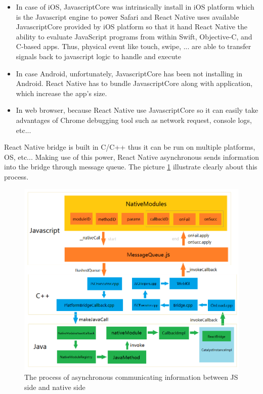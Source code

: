 \begin{itemize}
\item In case of iOS, JavascriptCore was intrinsically install in iOS platform which is the Javascript engine to power Safari and React Native uses available JavascriptCore provided by iOS platform so that it hand React Native the ability to evaluate JavaScript programs from within Swift, Objective-C, and C-based apps. Thus, physical event like touch, swipe, ... are able to transfer signals back to javascript logic to handle and execute
\item In case Android, unfortunately, JavascriptCore has been not installing in Android. React Native has to bundle JavascriptCore along with application, which increase the app's size. 
\item In web browser, because React Native use JavascriptCore so it can easily take advantages of Chrome debugging tool such as network request, console logs, etc... 
\end{itemize}

React Native bridge is built in C/C++ thus it can be run on multiple platforms, OS, etc... Making use of this power, React Native asynchronous sends information into the bridge through message queue. The picture \ref{fig:RN-process-communication} illustrate clearly about this process.
	
\begin{figure}[!h]
   	\centering
    	\includegraphics[scale=0.5]{Picture/mobile/RN-bridge.png}
     	\caption{The process of asynchronous communicating information between JS side and native side}
	\label{fig:RN-process-communication}
\end{figure}
	
